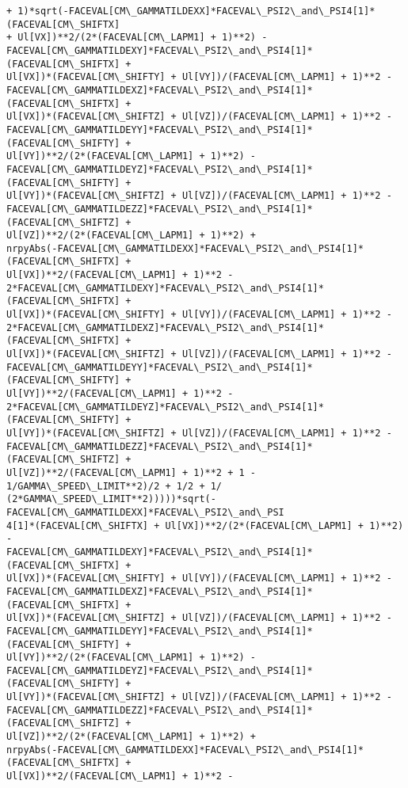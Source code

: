 \documentclass[landscape,letterpaper,10pt,english]{article}
\begin{document}
\begin{Verbatim}[commandchars=\\\{\}]
+ 1)*sqrt(-FACEVAL[CM\_GAMMATILDEXX]*FACEVAL\_PSI2\_and\_PSI4[1]*(FACEVAL[CM\_SHIFTX]
+ Ul[VX])**2/(2*(FACEVAL[CM\_LAPM1] + 1)**2) -
FACEVAL[CM\_GAMMATILDEXY]*FACEVAL\_PSI2\_and\_PSI4[1]*(FACEVAL[CM\_SHIFTX] +
Ul[VX])*(FACEVAL[CM\_SHIFTY] + Ul[VY])/(FACEVAL[CM\_LAPM1] + 1)**2 -
FACEVAL[CM\_GAMMATILDEXZ]*FACEVAL\_PSI2\_and\_PSI4[1]*(FACEVAL[CM\_SHIFTX] +
Ul[VX])*(FACEVAL[CM\_SHIFTZ] + Ul[VZ])/(FACEVAL[CM\_LAPM1] + 1)**2 -
FACEVAL[CM\_GAMMATILDEYY]*FACEVAL\_PSI2\_and\_PSI4[1]*(FACEVAL[CM\_SHIFTY] +
Ul[VY])**2/(2*(FACEVAL[CM\_LAPM1] + 1)**2) -
FACEVAL[CM\_GAMMATILDEYZ]*FACEVAL\_PSI2\_and\_PSI4[1]*(FACEVAL[CM\_SHIFTY] +
Ul[VY])*(FACEVAL[CM\_SHIFTZ] + Ul[VZ])/(FACEVAL[CM\_LAPM1] + 1)**2 -
FACEVAL[CM\_GAMMATILDEZZ]*FACEVAL\_PSI2\_and\_PSI4[1]*(FACEVAL[CM\_SHIFTZ] +
Ul[VZ])**2/(2*(FACEVAL[CM\_LAPM1] + 1)**2) +
nrpyAbs(-FACEVAL[CM\_GAMMATILDEXX]*FACEVAL\_PSI2\_and\_PSI4[1]*(FACEVAL[CM\_SHIFTX] +
Ul[VX])**2/(FACEVAL[CM\_LAPM1] + 1)**2 -
2*FACEVAL[CM\_GAMMATILDEXY]*FACEVAL\_PSI2\_and\_PSI4[1]*(FACEVAL[CM\_SHIFTX] +
Ul[VX])*(FACEVAL[CM\_SHIFTY] + Ul[VY])/(FACEVAL[CM\_LAPM1] + 1)**2 -
2*FACEVAL[CM\_GAMMATILDEXZ]*FACEVAL\_PSI2\_and\_PSI4[1]*(FACEVAL[CM\_SHIFTX] +
Ul[VX])*(FACEVAL[CM\_SHIFTZ] + Ul[VZ])/(FACEVAL[CM\_LAPM1] + 1)**2 -
FACEVAL[CM\_GAMMATILDEYY]*FACEVAL\_PSI2\_and\_PSI4[1]*(FACEVAL[CM\_SHIFTY] +
Ul[VY])**2/(FACEVAL[CM\_LAPM1] + 1)**2 -
2*FACEVAL[CM\_GAMMATILDEYZ]*FACEVAL\_PSI2\_and\_PSI4[1]*(FACEVAL[CM\_SHIFTY] +
Ul[VY])*(FACEVAL[CM\_SHIFTZ] + Ul[VZ])/(FACEVAL[CM\_LAPM1] + 1)**2 -
FACEVAL[CM\_GAMMATILDEZZ]*FACEVAL\_PSI2\_and\_PSI4[1]*(FACEVAL[CM\_SHIFTZ] +
Ul[VZ])**2/(FACEVAL[CM\_LAPM1] + 1)**2 + 1 - 1/GAMMA\_SPEED\_LIMIT**2)/2 + 1/2 + 1/
(2*GAMMA\_SPEED\_LIMIT**2)))))*sqrt(-FACEVAL[CM\_GAMMATILDEXX]*FACEVAL\_PSI2\_and\_PSI
4[1]*(FACEVAL[CM\_SHIFTX] + Ul[VX])**2/(2*(FACEVAL[CM\_LAPM1] + 1)**2) -
FACEVAL[CM\_GAMMATILDEXY]*FACEVAL\_PSI2\_and\_PSI4[1]*(FACEVAL[CM\_SHIFTX] +
Ul[VX])*(FACEVAL[CM\_SHIFTY] + Ul[VY])/(FACEVAL[CM\_LAPM1] + 1)**2 -
FACEVAL[CM\_GAMMATILDEXZ]*FACEVAL\_PSI2\_and\_PSI4[1]*(FACEVAL[CM\_SHIFTX] +
Ul[VX])*(FACEVAL[CM\_SHIFTZ] + Ul[VZ])/(FACEVAL[CM\_LAPM1] + 1)**2 -
FACEVAL[CM\_GAMMATILDEYY]*FACEVAL\_PSI2\_and\_PSI4[1]*(FACEVAL[CM\_SHIFTY] +
Ul[VY])**2/(2*(FACEVAL[CM\_LAPM1] + 1)**2) -
FACEVAL[CM\_GAMMATILDEYZ]*FACEVAL\_PSI2\_and\_PSI4[1]*(FACEVAL[CM\_SHIFTY] +
Ul[VY])*(FACEVAL[CM\_SHIFTZ] + Ul[VZ])/(FACEVAL[CM\_LAPM1] + 1)**2 -
FACEVAL[CM\_GAMMATILDEZZ]*FACEVAL\_PSI2\_and\_PSI4[1]*(FACEVAL[CM\_SHIFTZ] +
Ul[VZ])**2/(2*(FACEVAL[CM\_LAPM1] + 1)**2) +
nrpyAbs(-FACEVAL[CM\_GAMMATILDEXX]*FACEVAL\_PSI2\_and\_PSI4[1]*(FACEVAL[CM\_SHIFTX] +
Ul[VX])**2/(FACEVAL[CM\_LAPM1] + 1)**2 -

\end{Verbatim}
\end{document}
